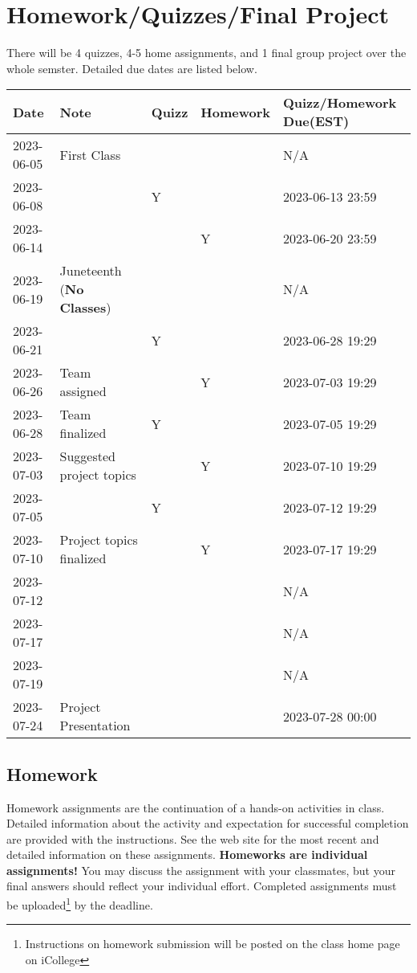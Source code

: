 \documentclass{article}
\begin{document}
\section{Homework/Quizzes/Final Project}
There will be 4 quizzes, 4-5 home assignments, and 1 final group project over the whole semster. Detailed due dates are listed below.
\begin{center}
	\begin{tabular}{lllll}
		\hline
		Date & Note & Quizz & Homework & Quizz/Homework Due(EST) \\
		\hline
		2023-06-05 & First Class &  &  & N/A \\
        2023-06-08 & & Y & & 2023-06-13 23:59 \\
        2023-06-14 &  &  & Y & 2023-06-20 23:59 \\
        2023-06-19 & Juneteenth (\textbf{No Classes})  &  &  &  N/A\\
        2023-06-21 &  & Y &  & 2023-06-28 19:29 \\
        2023-06-26 & Team assigned &  & Y & 2023-07-03 19:29 \\
        2023-06-28 & Team finalized  & Y &  & 2023-07-05 19:29 \\
        2023-07-03 & Suggested project topics &  & Y & 2023-07-10 19:29 \\
        2023-07-05 &  & Y &  & 2023-07-12 19:29 \\
        2023-07-10 & Project topics finalized &  & Y & 2023-07-17 19:29 \\
        2023-07-12 &  &  &  &  N/A\\
        2023-07-17 &  &  &  &  N/A\\
        2023-07-19 &  &  &  &  N/A\\
		2023-07-24 & Project Presentation &  &  & 2023-07-28 00:00\\
		\hline        
	\end{tabular}
\end{center}



\subsection{Homework}
Homework assignments are the continuation of a hands-on activities in class. Detailed information about the activity and expectation for successful completion are provided with the instructions. See the web site for the most recent and detailed information on these assignments. \textbf{Homeworks are individual assignments!} You may discuss the assignment with your classmates, but your ﬁnal answers should reﬂect your individual eﬀort. Completed assignments must be uploaded\footnote{Instructions on homework submission will be posted on the class home page on iCollege} by the deadline.
\end{document}
